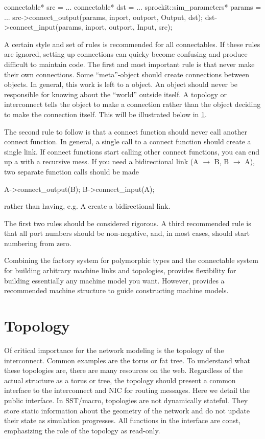 \begin{CppCode}
connectable* src = ...
connectable* dst = ...
sprockit::sim_parameters* params = ...
src->connect_output(params, inport, outport, Output, dst);
dst->connect_input(params, inport, outport, Input, src);
\end{CppCode}

A certain style and set of rules is recommended for all connectables.
If these rules are ignored, setting up connections can quicky become confusing and produce difficult to maintain code.
The first and most important rule is that  never make their own connections.
Some ``meta''-object should create connections between objects.
In general, this work is left to a  object.
An object should never be responsible for knowing about the ``world'' outside itself.
A topology or interconnect tells the object to make a connection rather than the object deciding to make the connection itself.
This will be illustrated below in \ref{sec:topology}.

The second rule to follow is that a connect function should never call another connect function.
In general, a single call to a connect function should create a single link.
If connect functions start calling other connect functions, you can end up a with a recursive mess.
If you need a bidirectional link (A $\rightarrow$ B, B $\rightarrow$ A),
two separate function calls should be made

\begin{CppCode}
A->connect_output(B);
B->connect_input(A);
\end{CppCode}

rather than having, e.g. A create a bidirectional link.

The first two rules should be considered rigorous. 
A third recommended rule is that all port numbers should be non-negative, and, in most cases, should start numbering from zero.


Combining the factory system for polymorphic types and the connectable system for building arbitrary machine links and topologies,
\sstmacro provides flexibility for building essentially any machine model you want.
However, \sstmacro provides a recommended machine structure to guide constructing machine models.

\section{Topology}
\label{sec:topology}
Of critical importance for the network modeling is the topology of the interconnect.
Common examples are the torus or fat tree.
To understand what these topologies are, there are many resources on the web.
Regardless of the actual structure as a torus or tree, the topology should present a common interface to the interconnect and NIC for routing messages.
Here we detail the public interface.
In SST/macro, topologies are not dynamically stateful.
They store static information about the geometry of the network and do not update their state as simulation progresses.
All functions in the interface are const, emphasizing the role of the topology as read-only.

